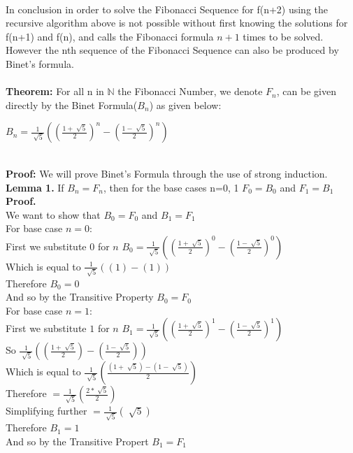 \documentclass{article}
\begin{document}
\\
In conclusion in order to solve the Fibonacci Sequence for f(n+2) using the recursive algorithm above is not possible without first knowing the solutions for f(n+1) and f(n), and calls the Fibonacci formula $n+1$ times to be solved.  
\\
However the nth sequence of the Fibonacci Sequence can also be produced by Binet's formula.
\\
\\
{\bf Theorem:} For all n in $\mathbb{N}$ the Fibonacci Number, we denote $F_n$, can be given directly by the Binet Formula($B_n$) as given below:
\\
\begin{center}
	$B_n=\frac{1}{\sqrt[]{5}}((\frac{1+\sqrt[]{5}}{2})^n-(\frac{1-\sqrt[]{5}}{2})^n)$
\end{center}
~\\
{\bf Proof:} We will prove Binet's Formula through the use of strong induction.
\\
{\bf Lemma 1.} 
If $B_n=F_n$, then for the base cases n=0, 1 $F_0=B_0$ and $F_1=B_1$  
\\
{\bf Proof.}
\\
	We want to show that $B_0=F_0$ and $B_1=F_1$
	\\
	For base case $n=0$:
	\\
	First we substitute $0$ for $n$ $B_0=\frac{1}{\sqrt[]{5}}((\frac{1+\sqrt[]{5}}{2})^0-(\frac{1-\sqrt[]{5}}{2})^0)$
	\\
	Which is equal to $\frac{1}{\sqrt[]{5}}((1)-(1))$
	\\
	Therefore $B_0=0$
	\\
	And so by the Transitive Property $B_0=F_0$
	\\
	For base case $n=1$:
	\\
	First we substitute $1$ for $n$ $B_1=\frac{1}{\sqrt[]{5}}((\frac{1+\sqrt[]{5}}{2})^1-(\frac{1-\sqrt[]{5}}{2})^1)$
	\\
	So $\frac{1}{\sqrt[]{5}}((\frac{1+\sqrt[]{5}}{2})-(\frac{1-\sqrt[]{5}}{2}))$
	\\
	Which is equal to $\frac{1}{\sqrt[]{5}}(\frac{(1+\sqrt[]{5})-(1-\sqrt[]{5})}{2})$
	\\
	Therefore $=\frac{1}{\sqrt[]{5}}(\frac{2*\sqrt[]{5}}{2})$
	\\
	Simplifying further $=\frac{1}{\sqrt[]{5}}(\sqrt[]{5})$
	\\
	Therefore $B_1=1$ 
	\\
	And so by the Transitive Propert $B_1=F_1$
\end{document}
